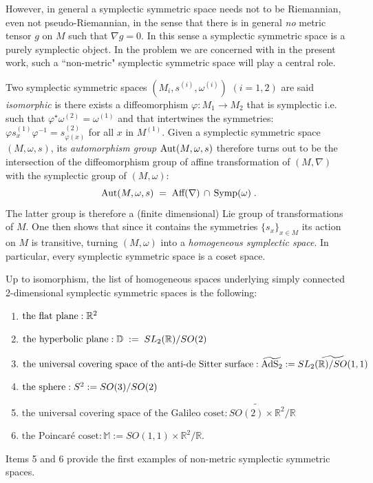 \documentclass{article}
\newcommand{\DD}{\mathbb D}
\newcommand{\R}{\mathbb R}
\newcommand{\MM}{\mathbb M}
\def \R{{\mathbb R}}
\begin{document}
\noindent However, in general a symplectic symmetric space
needs not to be Riemannian, even not pseudo-Riemannian, in the sense that there is in general {\sl no} metric tensor $g$ on $M$ such that $\nabla g=0$. In this sense a symplectic symmetric space is a purely 
symplectic object. In the problem we are concerned with in the present work, such a ``non-metric"
symplectic symmetric space will play a central role.

\vspace{2mm}

\noindent Two symplectic symmetric spaces $(M_i,s^{(i)},\omega^{(i)})$ $(i=1,2)$ are said {\sl isomorphic}
is there exists a diffeomorphism $\varphi:M_1\to M_2$ that is symplectic i.e. such that $\varphi^\star\omega^{(2)}=\omega^{(1)}$ and that intertwines the symmetries: $\varphi s^{(1)}_x\varphi^{-1}=s^{(2)}_{\varphi(x)}$ for all $x$ in $M^{(1)}$. Given a symplectic symmetric space $(M,\omega,s)$,
its {\sl automorphism  group} $\mbox{\rm Aut}(M,\omega,s)$ therefore turns out to be the intersection of the diffeomorphism group
of affine transformation of $(M,\nabla)$ with the symplectic group of $(M,\omega)$:
\begin{equation}
\mbox{\rm Aut}(M,\omega,s)\;=\;\mbox{\rm Aff}(\nabla)\,\cap\,\mbox{\rm Symp}(\omega)\;.
\end{equation}
The latter group is therefore a (finite dimensional) Lie group of transformations of $M$. One 
then  shows that since it contains the symmetries $\{s_x\}_{x\in M}$ its action on $M$ is transitive,
turning $(M,\omega)$ into a {\sl homogeneous symplectic space}. In particular, every symplectic 
symmetric space is a coset space.

\vspace{2mm}

\noindent Up to isomorphism, the list of homogeneous spaces underlying simply connected 2-dimensional symplectic symmetric spaces is the following:
\begin{enumerate}
\item$\mbox{\rm the flat plane}: \R^2$
\item$\mbox{\rm the hyperbolic plane}: \DD\;:=\;SL_2(\R)/SO(2)$
\item$\mbox{\rm the universal covering space of the anti-de Sitter surface}: \widetilde{\mbox{\rm AdS}_2}:=\widetilde{SL_2(\R)/SO(1,1)}$
\item$\mbox{\rm the sphere}: S^2:=SO(3)/SO(2)$
\item$\mbox{the universal covering space of the Galileo coset}: \widetilde{SO(2)\times\R^2}/\R$
\item$\mbox{the Poincar\'e coset}: \MM:=SO(1,1)\times\R^2/\R$.
\end{enumerate}
Items 5 and 6 provide the first examples of non-metric symplectic symmetric spaces.
\end{document}
